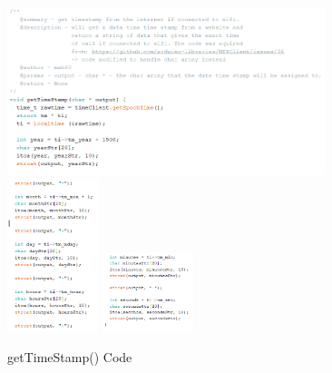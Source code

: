 \documentclass{report}
\begin{document}
\begin{figure}[h!]
    \centering
    \includegraphics[width=350]{getTime_1.PNG} 
    \includegraphics[width=100]{getTime_2.PNG}
    \includegraphics[width=100]{getTime_3.PNG}
    \caption{getTimeStamp() Code}
    \label{fig:getTime}
\end{figure} \\
\end{document}
